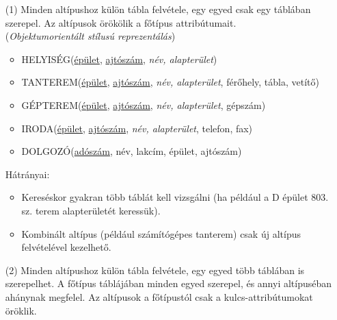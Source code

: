 \documentclass[tikz,12pt,margin=0px]{article}
\begin{document}
	\begin{itemize}
        \item[(1)] Minden altípushoz külön tábla felvétele, egy egyed csak egy táblában szerepel. Az altípusok örökölik a főtípus attribútumait. \\

        (\emph{Objektumorientált stílusú reprezentálás})
        {\small
        \begin{itemize}
            \item HELYISÉG(\underline{épület}, \underline{ajtószám}, \emph{név, alapterület})
            \item TANTEREM(\underline{épület}, \underline{ajtószám}, \emph{név, alapterület}, férőhely, tábla, vetítő)
            \item GÉPTEREM(\underline{épület}, \underline{ajtószám}, \emph{név, alapterület}, gépszám)
            \item IRODA(\underline{épület}, \underline{ajtószám}, \emph{név, alapterület}, telefon, fax)
            \item DOLGOZÓ(\underline{adószám}, név, lakcím, épület, ajtószám)
        \end{itemize}
        }
        Hátrányai:
        \begin{itemize}
            \item Kereséskor gyakran több táblát kell vizsgálni (ha például a D épület 803. sz. terem alapterületét keressük).
            \item Kombinált altípus (például számítógépes tanterem) csak új altípus felvételével kezelhető.
        \end{itemize}
\newpage
        \item[(2)] Minden altípushoz külön tábla felvétele, egy egyed több táblában is szerepelhet. A főtípus táblájában minden egyed szerepel, és annyi altípuséban ahánynak megfelel. Az altípusok a főtípustól csak a kulcs-attribútumokat öröklik.\\


\end{itemize}
\end{document}
